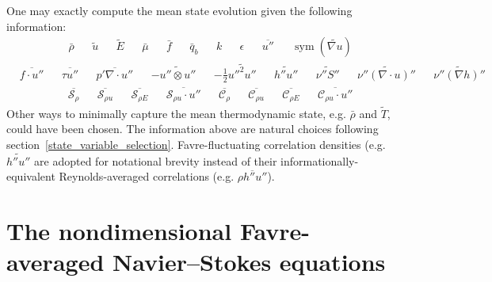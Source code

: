 \documentclass[letterpaper,11pt,nointlimits,reqno,draft]{amsbook}
\newcommand{\symmetricpart}[1]
  {\ensuremath{\operatorname{sym}\left(#1\right)}}
\newcommand{\Ssd}{\ensuremath{\mathcal{S}}} %
\newcommand{\Cs}{\ensuremath{\mathcal{C}}}  %
\begin{document}
One may exactly compute the mean state evolution given the following
information:
\begin{align}
&\bar{\rho}
&
&\tilde{u}
&
&\tilde{E}
&
&\bar{\mu}
&
&\bar{f}
&
&\bar{q}_b
&
&k
&
&\epsilon
&
&\overline{u''}
&
&\symmetricpart{\widetilde{\nabla{}u}}
\end{align}
\begin{align}
&\overline{f\cdot{}u''}
&
&\overline{\tau{}u''}
&
&\overline{p'\nabla\cdot{}u''}
&
&-\widetilde{u''\otimes{}u''}
&
&-\frac{1}{2}\widetilde{{u''}^{2}u''}
&
&\widetilde{h''u''}
&
&\widetilde{\nu''S''}
&
&\widetilde{\nu''\left(\nabla\cdot{}u\right)''}
&
&\widetilde{\nu''\left(\nabla{}h\right)''}
\end{align}
\begin{align}
&\overline{\Ssd_{\rho{}}}
&
&\overline{\Ssd_{\rho{} u}}
&
&\overline{\Ssd_{\rho{} E}}
&
&\overline{\Ssd_{\rho{} u}\cdot{}u''}
&
&\overline{\Cs_{\rho{}}}
&
&\overline{\Cs_{\rho{} u}}
&
&\overline{\Cs_{\rho{} E}}
&
&\overline{\Cs_{\rho{} u}\cdot{}u''}
\end{align}
Other ways to minimally capture the mean thermodynamic state, e.g. $\bar{\rho}$
and $\tilde{T}$, could have been chosen.  The information above are natural
choices following section~\ref{state_variable_selection}.  Favre-fluctuating
correlation densities (e.g.  $\widetilde{h''u''}$ are adopted for notational
brevity instead of their informationally-equivalent Reynolds-averaged
correlations (e.g.  $\overline{\rho{}h''u''}$).

\section{The nondimensional Favre-averaged Navier--Stokes equations}
\label{sec:nondimfans}
\end{document}
